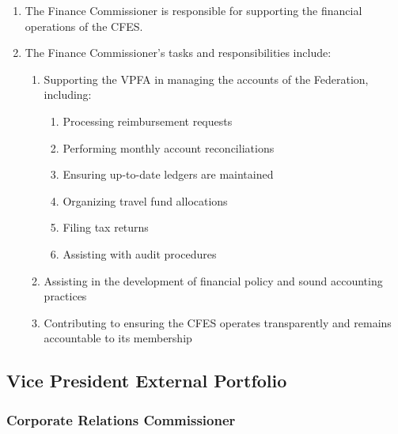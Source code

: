 \begin{enumerate}
 \item
  The Finance Commissioner is responsible for supporting the financial operations of the CFES.
 \item
  The Finance Commissioner’s tasks and responsibilities include:

  \begin{enumerate}
   \item
    Supporting the VPFA in managing the accounts of the Federation, including:

    \begin{enumerate}
     \item
      Processing reimbursement requests
     \item
      Performing monthly account reconciliations
     \item
      Ensuring up-to-date ledgers are maintained
     \item
      Organizing travel fund allocations
     \item
      Filing tax returns
     \item
      Assisting with audit procedures
    \end{enumerate}

   \item
    Assisting in the development of financial policy and sound accounting practices
   \item
    Contributing to ensuring the CFES operates transparently and remains accountable to its membership
  \end{enumerate}
\end{enumerate}

\subsection{Vice President External Portfolio}
\label{vpe-portfolio}

\subsubsection{Corporate Relations Commissioner}
\label{corporate-relations-commissioner}


